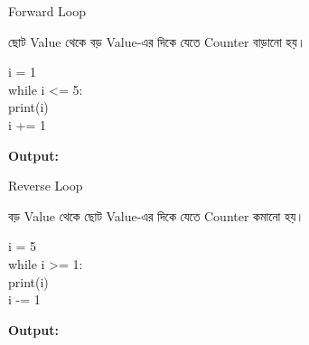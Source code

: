 \noindent
\begin{minipage}[t]{0.49\linewidth}

\begin{sideexamplebox}{Forward Loop}

ছোট Value থেকে বড় Value-এর দিকে যেতে Counter বাড়ানো হয়।

\begin{sidecodebox}
\begin{english}
\ttfamily
i = 1\\
while i <= 5:\\
\hspace*{4mm}print(i)\\
\hspace*{4mm}i += 1
\end{english}
\end{sidecodebox}

\textbf{Output:}

\begin{center}
\textenglish{    }
\end{center}

\end{sideexamplebox}

\end{minipage}
\hfill
\begin{minipage}[t]{0.49\linewidth}

\begin{sideexamplebox}{Reverse Loop}

বড় Value থেকে ছোট Value-এর দিকে যেতে Counter কমানো হয়।

\begin{sidecodebox}
\begin{english}
\ttfamily
i = 5\\
while i >= 1:\\
\hspace*{4mm}print(i)\\
\hspace*{4mm}i -= 1
\end{english}
\end{sidecodebox}

\textbf{Output:}

\begin{center}
\textenglish{    }
\end{center}

\end{sideexamplebox}

\end{minipage}

